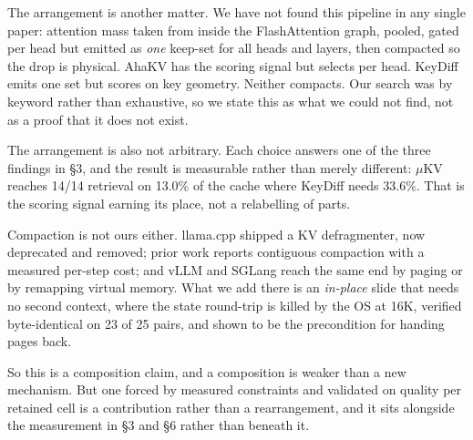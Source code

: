 \documentclass[11pt]{article}
\begin{document}
The arrangement is another matter. We have not found this pipeline in any single paper:
attention mass taken from inside the FlashAttention graph, pooled, gated per head but emitted
as \emph{one} keep-set for all heads and layers, then compacted so the drop is physical. AhaKV
has the scoring signal but selects per head. KeyDiff emits one set but scores on key geometry.
Neither compacts. Our search was by keyword rather than exhaustive, so we state this as what we
could not find, not as a proof that it does not exist.

The arrangement is also not arbitrary. Each choice answers one of the three findings in \S3,
and the result is measurable rather than merely different: $\mu$KV reaches 14/14 retrieval on
13.0\% of the cache where KeyDiff needs 33.6\%. That is the scoring signal earning its place,
not a relabelling of parts.

Compaction is not ours either. llama.cpp shipped a KV defragmenter, now deprecated and removed;
prior work reports contiguous compaction with a measured per-step cost; and vLLM and SGLang
reach the same end by paging or by remapping virtual memory. What we add there is an
\emph{in-place} slide that needs no second context, where the state round-trip is killed by the
OS at 16K, verified byte-identical on 23 of 25 pairs, and shown to be the precondition for
handing pages back.

So this is a composition claim, and a composition is weaker than a new mechanism. But one
forced by measured constraints and validated on quality per retained cell is a contribution
rather than a rearrangement, and it sits alongside the measurement in \S3 and \S6 rather than
beneath it.
\end{document}
